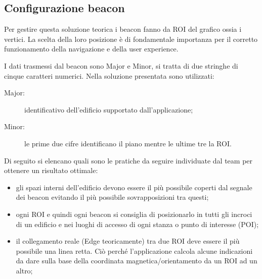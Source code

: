 \documentclass[../ManualeSviluppatore.tex]{subfiles}
\begin{document}
		
	\subsection{Configurazione beacon}
		Per gestire questa soluzione teorica i beacon fanno da ROI del grafico ossia i vertici. La scelta della loro posizione è di fondamentale importanza per il corretto funzionamento della navigazione e della user experience. 

		I dati trasmessi dal \gls{beacon} sono Major e Minor, si tratta di due stringhe di cinque caratteri numerici. Nella soluzione presentata sono utilizzati:
		\begin{description}
			\item[Major:] identificativo dell'edificio supportato dall'applicazione;
			\item[Minor:] le prime due cifre identificano il piano mentre le ultime tre la ROI.
		\end{description}			
		
		Di seguito si elencano quali sono le pratiche da seguire individuate dal team \leaf per ottenere un risultato ottimale:
		\begin{itemize}
			\item gli spazi interni dell'edificio devono essere il più possibile coperti dal segnale dei \gls{beacon} evitando il più possibile sovrapposizioni tra questi;
			\item ogni ROI e quindi ogni \gls{beacon} si consiglia di posizionarlo in tutti gli incroci di un edificio e nei luoghi di accesso di ogni stanza o punto di interesse (POI);
			\item il collegamento reale (Edge teoricamente) tra due ROI deve essere il più possibile una linea retta. Ciò perché l'applicazione calcola alcune indicazioni da dare sulla base della coordinata magnetica/orientamento da un ROI ad un altro;
		\end{itemize}
\end{document}
